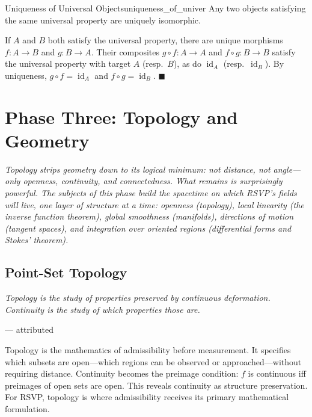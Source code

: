 \documentclass[12pt, twoside, openright, a4paper]{book}
\renewenvironment{proof}{%
  \par\medskip\noindent{\color{RSVPgreen}\bfseries\sffamily Proof.}\enspace\ignorespaces
}{\hfill{\color{RSVPgreen}$\blacksquare$}\par\medskip}
\newcommand{\sidenote}[1]{\marginnote{#1}}
\newcommand{\id}{\operatorname{id}}
\newcommand{\chapterepigraph}[2]{%
  \vspace{-8pt}\begin{center}\begin{minipage}{0.78\textwidth}
  \small\itshape #1\begin{flushright}--- #2\end{flushright}
  \end{minipage}\end{center}\vspace{10pt}}
\newcommand{\partintro}[1]{%
  \begin{tcolorbox}[enhanced, colback=RSVPdeep, colframe=RSVPdeep, coltext=white,
    arc=6pt, boxrule=0pt, left=8mm, right=8mm, top=6mm, bottom=6mm]
  \large\itshape #1\end{tcolorbox}}
\begin{document}
\begin{theorem}{Uniqueness of Universal Objects}{uniqueness_of_univer}
Any two objects satisfying the same universal property are uniquely isomorphic.
\end{theorem}
\begin{proof}
If $A$ and $B$ both satisfy the universal property, there are unique morphisms $f: A \to B$ and $g: B \to A$.
Their composites $g \circ f: A \to A$ and $f \circ g: B \to B$ satisfy the universal property with target $A$ (resp.\ $B$), as do $\id_A$ (resp.\ $\id_B$).
By uniqueness, $g \circ f = \id_A$ and $f \circ g = \id_B$.
\end{proof}

\part{Phase Three: Topology and Geometry}

\partintro{Topology strips geometry down to its logical minimum: not distance,
not angle---only openness, continuity, and connectedness. What remains is
surprisingly powerful. The subjects of this phase build the spacetime on which
RSVP's fields will live, one layer of structure at a time: openness (topology),
local linearity (the inverse function theorem), global smoothness (manifolds),
directions of motion (tangent spaces), and integration over oriented regions
(differential forms and Stokes' theorem).}

\chapter{Point-Set Topology}
\chapterepigraph{Topology is the study of properties preserved by continuous deformation.
Continuity is the study of which properties those are.}{attributed}
\sidenote{Recommended:\\Munkres,\\\textit{Topology}}
\label{ch:topology}

\begin{motivation}
Topology is the mathematics of admissibility before measurement.
It specifies which subsets are open---which regions can be observed or approached---without requiring distance.
Continuity becomes the preimage condition: $f$ is continuous iff preimages of open sets are open.
This reveals continuity as structure preservation.
For RSVP, topology is where admissibility receives its primary mathematical formulation.
\end{motivation}
\end{document}
